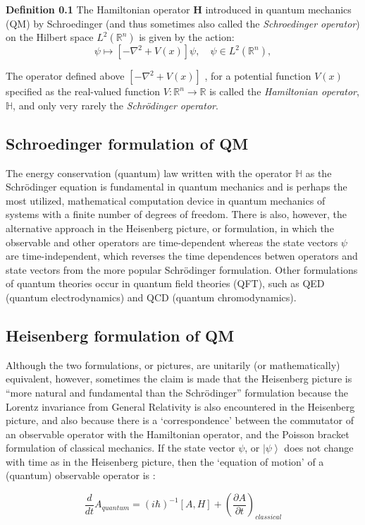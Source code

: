 \documentclass[12pt]{article}
\newcounter{123listctr}
\newcounter{123listcolonstylectr}
\newcommand{\Rset}{\mathbb{R}}
\begin{document}
{\bf Definition 0.1}
 The {Hamiltonian operator} \textbf{H} introduced in quantum mechanics (QM) by Schroedinger (and thus sometimes also called the \emph{Schroedinger operator}) on the Hilbert space $L^2(\Rset^n)$ is given by the action:
\[
\psi \mapsto [-\nabla^2 +V(x)]\psi, \quad\psi\in L^2(\Rset^n),
\]

 The operator defined above $[-\nabla^2 +V(x)]$ , for a potential function $V(x)$ specified as the real-valued function $V\colon \Rset^n \to \Rset$ is called the {\em Hamiltonian operator}, $\mathbb{H}$, and only very rarely the {\em Schr\"odinger operator}.

\subsection{Schroedinger formulation of QM}
 The energy conservation (quantum) law written with the operator $\mathbb{H}$ as the
Schr\"odinger equation is fundamental in quantum mechanics and is perhaps the most utilized, mathematical computation device in quantum mechanics of systems with a finite number of degrees of freedom. There is also, however, the alternative approach in the Heisenberg picture, or formulation, in which the observable and other operators are time-dependent whereas the state vectors $\psi$ are time-independent, which reverses the time dependences betwen operators and state vectors from the more popular Schr\"odinger formulation. Other formulations of quantum theories occur in
quantum field theories (QFT), such as QED (quantum electrodynamics) and QCD (quantum chromodynamics).

\subsection{Heisenberg formulation of QM}

  Although the two formulations, or pictures, are unitarily (or mathematically) equivalent, however, sometimes the claim is made that the Heisenberg picture is ``more natural and fundamental than the Schr\"odinger'' formulation because the Lorentz invariance from General Relativity is also encountered in the Heisenberg picture,
and also because there is a `correspondence' between the commutator of an observable operator with the Hamiltonian operator, and the Poisson bracket formulation of classical mechanics. If the state vector $\psi$, or  
$\left| \psi \right\rangle$ does not change with time as in the Heisenberg picture, then the `equation of motion'
of a (quantum) observable operator is :

\[
 \frac{d}{dt} A_{quantum} = (i\hbar)^{-1}[A,H] + \left(\frac {\partial A}{\partial t}\right)_{classical}
\]

\end{document}
